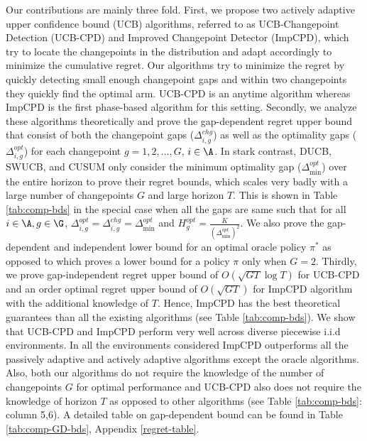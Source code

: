 Our contributions are mainly three fold. First, we propose two actively adaptive upper confidence bound (UCB) algorithms, referred to as UCB-Changepoint Detection (UCB-CPD) and Improved Changepoint Detector (ImpCPD), which try to locate the changepoints in the distribution and adapt accordingly to minimize the cumulative regret. Our algorithms try to minimize the regret by quickly detecting small enough changepoint gaps and within two changepoints they quickly find the optimal arm. UCB-CPD is an anytime algorithm whereas ImpCPD is the first phase-based algorithm for this setting. Secondly, we analyze these algorithms theoretically and prove the gap-dependent regret upper bound that consist of both the changepoint gaps ($\Delta^{chg}_{i,g}$) as well as the optimality gaps ($\Delta^{opt}_{i,g}$) for each changepoint $g=1,2,\ldots,G$, $i\in\A$. In stark contrast, DUCB, SWUCB, and CUSUM only consider the minimum optimality gap ($\Delta^{opt}_{\min}$) over the entire horizon to prove their regret bounds, which scales very badly with a large number of changepoints $G$ and large horizon $T$. This is shown in Table \ref{tab:comp-bds} in the special case when all the gaps are same such that for all $i\in\A,g\in\G$, $\Delta^{opt}_{i,g} = \Delta^{chg}_{i,g} =  \Delta^{opt}_{\min}$ and $H^{opt}_g = \frac{K}{(\Delta^{opt}_{\min})^2}$. We also prove the gap-dependent and independent lower bound for an optimal oracle policy $\pi^*$ as opposed to \citet{garivier2011upper} which proves a lower bound for a policy $\pi$ only when $G=2$. Thirdly, we prove gap-independent regret upper bound of $O( \sqrt{GT}\log T)$ for UCB-CPD and an order optimal regret upper bound of $O( \sqrt{GT})$ for ImpCPD algorithm with the additional knowledge of $T$. Hence, ImpCPD has the best theoretical guarantees than all the existing algorithms (see Table \ref{tab:comp-bds}). We show that UCB-CPD and ImpCPD perform very well across diverse piecewise i.i.d environments. In all the environments considered ImpCPD outperforms all the passively adaptive and actively adaptive algorithms except the oracle algorithms. Also, both our algorithms do not require the knowledge of the number of changepoints $G$ for optimal performance and UCB-CPD also does not require the knowledge of horizon $T$ as opposed to other algorithms (see Table \ref{tab:comp-bds}: column 5,6). A detailed table on gap-dependent bound can be found in Table \ref{tab:comp-GD-bds}, Appendix \ref{regret-table}.




